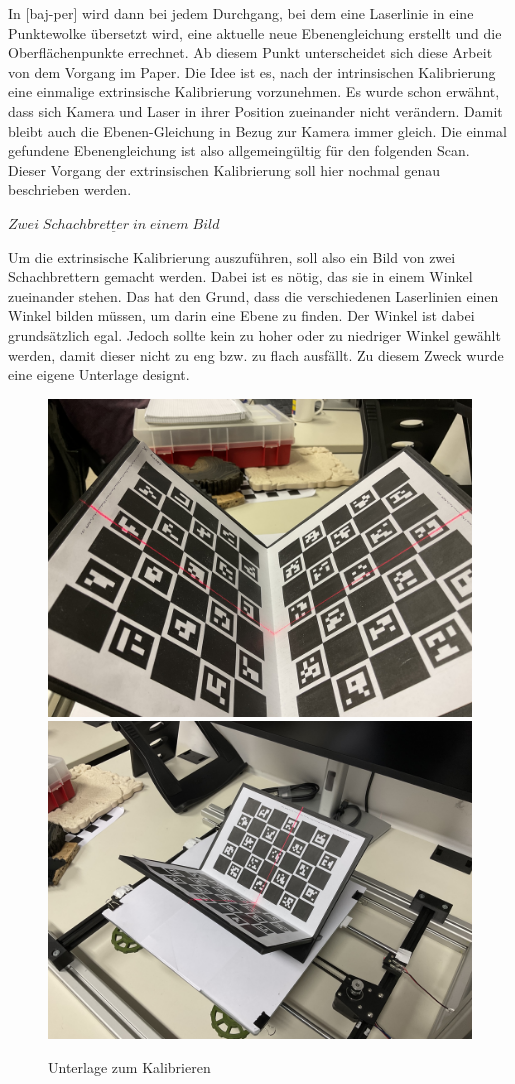 		In [baj-per] wird dann bei jedem Durchgang, bei dem eine Laserlinie in eine Punktewolke übersetzt wird, eine aktuelle neue Ebenengleichung erstellt und die Oberflächenpunkte errechnet. Ab diesem Punkt unterscheidet sich diese Arbeit von dem Vorgang im Paper. Die Idee ist es, nach der intrinsischen Kalibrierung eine einmalige extrinsische Kalibrierung vorzunehmen. Es wurde schon erwähnt, dass sich Kamera und Laser in ihrer Position zueinander nicht verändern. Damit bleibt auch die Ebenen-Gleichung in Bezug zur Kamera immer gleich. Die einmal gefundene Ebenengleichung ist also allgemeingültig für den folgenden Scan. Dieser Vorgang der extrinsischen Kalibrierung soll hier nochmal genau beschrieben werden.
		
		$\underline{Zwei \; Schachbretter \; in \; einem \; Bild}$
		
		Um die extrinsische Kalibrierung auszuführen, soll also ein Bild von zwei Schachbrettern gemacht werden. Dabei ist es nötig, das sie in einem Winkel zueinander stehen. Das hat den Grund, dass die verschiedenen Laserlinien einen Winkel bilden müssen, um darin eine Ebene zu finden. Der Winkel ist dabei grundsätzlich egal. Jedoch sollte kein zu hoher oder zu niedriger Winkel gewählt werden, damit dieser nicht zu eng bzw. zu flach ausfällt. Zu diesem Zweck wurde eine eigene Unterlage designt.
		
		\begin{figure}[h]
			\centering
			\includegraphics[width=0.49\linewidth]{img/hauptteil/ext-calib/pattern_0.jpg}
			\includegraphics[width=0.49\linewidth]{img/hauptteil/ext-calib/pattern_1.jpg}
			\caption{Unterlage zum Kalibrieren}
			\label{fig:ext-calib-pattern}
		\end{figure} 
	
